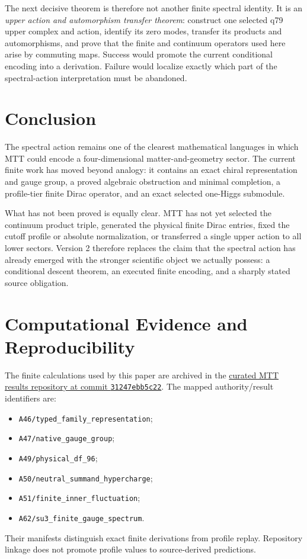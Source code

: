 \documentclass[11pt]{article}
\begin{document}
The next decisive theorem is therefore not another finite spectral identity.
It is an \emph{upper action and automorphism transfer theorem}: construct one
selected q79 upper complex and action, identify its zero modes, transfer its
products and automorphisms, and prove that the finite and continuum operators
used here arise by commuting maps.  Success would promote the current
conditional encoding into a derivation.  Failure would localize exactly which
part of the spectral-action interpretation must be abandoned.

\section{Conclusion}

The spectral action remains one of the clearest mathematical languages in
which MTT could encode a four-dimensional matter-and-geometry sector.  The
current finite work has moved beyond analogy: it contains an exact chiral
representation and gauge group, a proved algebraic obstruction and minimal
completion, a profile-tier finite Dirac operator, and an exact selected
one-Higgs submodule.

What has not been proved is equally clear.  MTT has not yet selected the
continuum product triple, generated the physical finite Dirac entries, fixed
the cutoff profile or absolute normalization, or transferred a single upper
action to all lower sectors.  Version 2 therefore replaces the claim that the
spectral action has already emerged with the stronger scientific object we
actually possess: a conditional descent theorem, an executed finite encoding,
and a sharply stated source obligation.

\section*{Computational Evidence and Reproducibility}
The finite calculations used by this paper are archived in the
\href{https://github.com/PeterNero/mtt-results-repro/tree/31247ebb5c22f3fbb5443024365433c6ee0bff4a}
{curated MTT results repository at commit \texttt{31247ebb5c22}}.
The mapped authority/result identifiers are:
\begin{itemize}
\item \nolinkurl{A46/typed_family_representation};
\item \nolinkurl{A47/native_gauge_group};
\item \nolinkurl{A49/physical_df_96};
\item \nolinkurl{A50/neutral_summand_hypercharge};
\item \nolinkurl{A51/finite_inner_fluctuation};
\item \nolinkurl{A62/su3_finite_gauge_spectrum}.
\end{itemize}
Their manifests distinguish exact finite derivations from profile replay.
Repository linkage does not promote profile values to source-derived
predictions.
\end{document}
